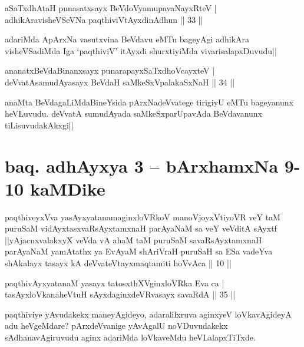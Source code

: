 
\begin{shl}
aSaTxdhA\s taH punasatxsayx BeVdoV\s yamupavaNayxRteV |\\
adhikAravisheVSeVNa paqthiviVtAyxdinA\s dhun \hfill || 33 ||
\end{shl}

\begin{artha}
adariMda ApArxNa vasutxvina BeVdavu eMTu bageyAgi adhikAra visheVSadiMda Iga `paqthiviV' itAyxdi shurxtiyiMda vivarisalapxDuvudu||
\end{artha}

\begin{shl}
ananatxBeVdaBinanxsayx punarapayxSaTxdhoVcayxteV |\\
deVvatAsamudAyasayx BeVdaH saMkeSxVpalakaSxNaH \hfill || 34 ||
\end{shl}

\begin{artha}
anaMta BeVdagaLiMdaBineYsida pArxNadeVvatege tirigiyU eMTu bageyanunx heVLuvudu. deVvatA sumudAyada saMkeSxparUpavAda BeVdavanunx tiLisuvudakAkxgi||
\end{artha}

\section*{baq. adhAyxya 3 -- bArxhamxNa 9-10 kaMDike}

\begin{shl}
paqthiveyxVva yasAyxyatanamaginxloVRkoV manoVjoyxVtiyoVR veY taM puruSaM vidAyxtasxvaRsAyxtamxnaH parAyaNaM sa veY veVditA sAyxtf ||yAjacnxvalakxyX veVda vA ahaM taM puruSaM savaRsAyxtamxnaH parAyaNaM yamAtathx ya EvAyaM shAriVraH puruSaH sa ESa vadeYva shAkalayx tasayx kA deVvateVtayxmaqtamiti hoVvAca || 10 ||
\end{shl}


\begin{shl}
paqthivAyxyatanaM yasayx tatosxthXV\s ginxloVRka Eva ca |\\
tasAyx\s \s loVkanaheVtuH sAyxdaginxdeVRvasayx savaRdA \hfill || 35 ||
\end{shl}

\begin{artha}
paqthiviye yAvudakekx maneyAgideyo, adaralilxruva aginxyeV loVkavAgideyA adu heVgeMdare? pArxdeVvanige yAvAgalU noVDuvudakekx sAdhanavAgiruvudu aginx adariMda loVkaveMdu heVLalapxTiTxde.
\end{artha}

